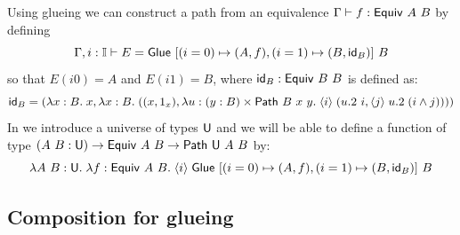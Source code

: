 \begin{example}
  \label{exa:equivtopath}
  Using glueing we can construct a path from an equivalence
  $\Gamma\vdash f{} : {\sf Equiv}~A~B$ by defining
  \[
  \Gamma,i:\mathbb{I} \vdash E =
  {\sf Glue}~[(i=0) \mapsto (A,f{}),(i=1) \mapsto (B,{\sf id}_B)]~B
  \]
  so that $E(i0) = A$ and $E(i1) = B$, where ${\sf id}_B : {\sf Equiv}~B~B$ is
  defined as:
  \[
  {\sf id}_B = (\lambda x : B. \; x,
  \lambda x : B. \; ((x,{1_{x}}),
  \lambda u : (y : B) \times {\sf Path}~B~x~y. \;
  {\langle}i{\rangle} \; (u.2~i,{\langle}j{\rangle} \; u.2 \; (i\wedge j))))
  \]
  In  we introduce a universe of types $\mathsf{U}$ 
  and  we will be able to define a function of type
  $(A~B : \mathsf{U}) \rightarrow {\sf Equiv}~A~B \rightarrow {\sf Path}~\mathsf{U}~A~B$ by:
  \[
  \lambda A~B:\mathsf{U}. \; \lambda f{} : {\sf Equiv}~A~B. \;
  {\langle}i{\rangle} \; {\sf Glue}~[(i=0) \mapsto (A,f{}),(i=1) \mapsto (B,{\sf id}_B)]~B
  \]
\end{example}

\subsection{Composition for glueing}\label{sec:composition-glueing}

